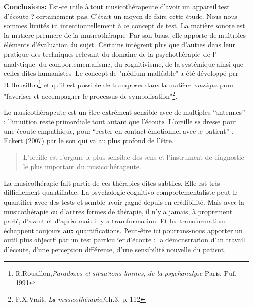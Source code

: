 \textbf{Conclusions:}
        Est-ce utile à tout musicothérapeute d'avoir un appareil test d'écoute ? certainement pas. C'était un moyen de faire cette étude.
     Nous nous sommes  limités ici intentionnellement
     à ce concept de test.
 La matière sonore est la matière première de la  musicothérapie. 
 Par son biais, elle  apporte de multiples éléments d'évaluation du
 sujet. 
 Certains  intégrent plus que d'autres dans leur pratique des techniques relevant du domaine de la psychothérapie--de l' analytique, 
  du comportementalisme, du cognitivisme, de la  systémique ainsi que
  celles dites humanistes.  Le concept de "médium malléable" a été
  développé par  R.Rousillon\footnote{R.Rousillon,\textit{Paradoxes et situations limites,  
  		de la psychanalyse} Paris, Puf. 1991} 
  et qu'il est possible de transposer dans la matière \textit{musique} 
  pour "favoriser et accompagner le processus 
  de symbolisation"\footnote{F.X.Vrait, \textit{La musicothérapie},Ch.3, p. 112}.

 Le musicothérapeute est un être extrêment sensible avec de multiples
 ``antennes'' : l'intuition reste primordiale tout autant que  
 l'écoute. L'oreille se dresse pour une écoute empathique, pour ``rester en contact émotionnel  
 avec le patient'' , Eckert (2007) par le son qui va au plus profond de
 l'être.

 
\begin{quotation}
	L'oreille est l'organe le plus sensible des sens 
et l'instrument de diagnostic  le plus important du
musicothérapeute.\autocite{seminar_zuerich}
 	
\end{quotation}
La musicothérapie fait partie de ces thérapies dites subtiles. Elle
est très difficilement quantifiable. La
psychologie cognitivo-comportementaliste peut le quantifier avec des tests et semble avoir gagné depuis en crédibilité. Mais avec la musicothérapie ou d'autres formes de thérapie, il n'y a
jamais, à proprement parlé, d'avant et d'après mais il y a transformation.
Et les transformations échappent toujours aux quantifications. Peut-être
ici pourrons-nous apporter un outil plus objectif par un test particulier
d'écoute : la démonstration d'un travail d'écoute, d'une perception
différente, d'une sensibilité nouvelle du patient. 



% 

